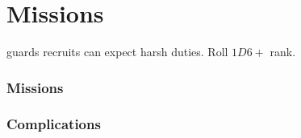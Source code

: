 \section{Missions}

\begin{multicols}{2}

\Glspl{guard} recruits can expect harsh duties.
Roll $1D6 +$ rank.

\subsubsection{Missions}

\ngMissions

\subsubsection{Complications}

\missionComplications

\end{multicols}
